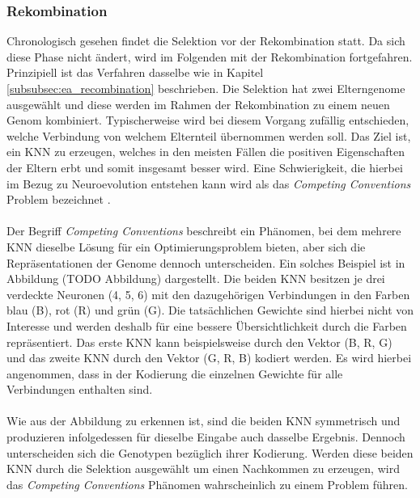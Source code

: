 \subsubsection{Rekombination}
Chronologisch gesehen findet die Selektion vor der Rekombination statt. Da sich diese Phase nicht ändert, wird im Folgenden mit der Rekombination fortgefahren. Prinzipiell ist das Verfahren dasselbe wie in Kapitel \ref{subsubsec:ea_recombination} beschrieben. Die Selektion hat zwei Elterngenome ausgewählt und diese werden im Rahmen der Rekombination zu einem neuen Genom kombiniert. Typischerweise wird bei diesem Vorgang zufällig entschieden, welche Verbindung von welchem Elternteil übernommen werden soll. Das Ziel ist, ein \ac{KNN} zu erzeugen, welches in den meisten Fällen die positiven Eigenschaften der Eltern erbt und somit insgesamt besser wird. Eine Schwierigkeit, die hierbei im Bezug zu Neuroevolution entstehen kann wird als das \emph{Competing Conventions} Problem bezeichnet \cite{stanley2002evolving}.
\\\\ %
Der Begriff \emph{Competing Conventions} beschreibt ein Phänomen, bei dem mehrere \ac{KNN} dieselbe Lösung für ein Optimierungsproblem bieten, aber sich die Repräsentationen der Genome dennoch unterscheiden. Ein solches Beispiel ist in Abbildung (TODO Abbildung) dargestellt. Die beiden \ac{KNN} besitzen je drei verdeckte Neuronen (4, 5, 6) mit den dazugehörigen Verbindungen in den Farben blau (B), rot (R) und grün (G). Die tatsächlichen Gewichte sind hierbei nicht von Interesse und werden deshalb für eine bessere Übersichtlichkeit durch die Farben repräsentiert. Das erste \ac{KNN} kann beispielsweise durch den Vektor (B, R, G) und das zweite \ac{KNN} durch den Vektor  (G, R, B) kodiert werden. Es wird hierbei angenommen, dass in der Kodierung die einzelnen Gewichte für alle Verbindungen enthalten sind. \\\\
Wie aus der Abbildung zu erkennen ist, sind die beiden \ac{KNN} symmetrisch und produzieren infolgedessen für dieselbe Eingabe auch dasselbe Ergebnis. Dennoch unterscheiden sich die Genotypen bezüglich ihrer Kodierung. Werden diese beiden \ac{KNN} durch die Selektion ausgewählt um einen Nachkommen zu erzeugen, wird das \emph{Competing Conventions} Phänomen wahrscheinlich zu einem Problem führen. \\\\
